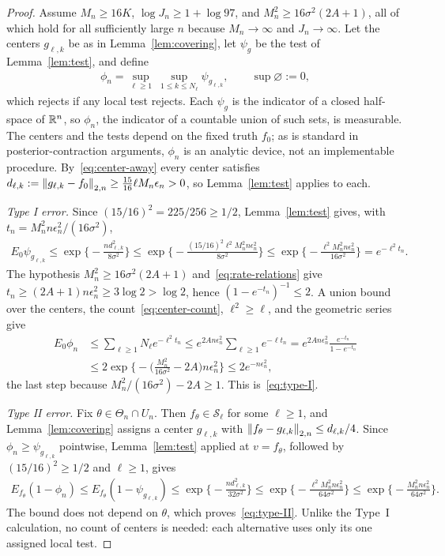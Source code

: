\begin{proof}[Proof]
Assume $M_n\geq16K$, $\log J_n\geq1+\log97$, and $M_n^2\geq16\sigma^2(2A+1)$, all of which hold for all sufficiently large $n$ because $M_n\to\infty$ and $J_n\to\infty$. Let the centers $g_{\ell,k}$ be as in Lemma~\ref{lem:covering}, let $\psi_g$ be the test of Lemma~\ref{lem:test}, and define
\begin{align*}
\phi_n=\sup_{\ell\geq1}\ \sup_{1\leq k\leq N_\ell}\psi_{g_{\ell,k}},
\qquad\sup\varnothing:=0,
\end{align*}
which rejects if any local test rejects. Each $\psi_g$ is the indicator of a closed half-space of $\mathbb{R}^n$, so $\phi_n$, the indicator of a countable union of such sets, is measurable. The centers and the tests depend on the fixed truth $f_0$; as is standard in posterior-contraction arguments, $\phi_n$ is an analytic device, not an implementable procedure. By~\eqref{eq:center-away} every center satisfies $d_{\ell,k}:=\left\lVert g_{\ell,k}-f_0 \right\rVert_{2,n}\geq\frac{15}{16}\ell M_n\epsilon_n>0$, so Lemma~\ref{lem:test} applies to each.

\emph{Type I error.} Since $(15/16)^2=225/256\geq1/2$, Lemma~\ref{lem:test} gives, with $t_n=M_n^2n\epsilon_n^2/(16\sigma^2)$,
\begin{align*}
E_0\psi_{g_{\ell,k}}
\leq\exp\Big\{-\frac{nd_{\ell,k}^2}{8\sigma^2}\Big\}
\leq\exp\Big\{-\frac{(15/16)^2\ell^2M_n^2n\epsilon_n^2}{8\sigma^2}\Big\}
\leq\exp\Big\{-\frac{\ell^2M_n^2n\epsilon_n^2}{16\sigma^2}\Big\}
=e^{-\ell^2t_n}.
\end{align*}
The hypothesis $M_n^2\geq16\sigma^2(2A+1)$ and~\eqref{eq:rate-relations} give $t_n\geq(2A+1)n\epsilon_n^2\geq3\log2>\log2$, hence $(1-e^{-t_n})^{-1}\leq2$. A union bound over the centers, the count~\eqref{eq:center-count}, $\ell^2\geq\ell$, and the geometric series give
\begin{align*}
E_0\phi_n
&\leq\sum_{\ell\geq1}N_\ell e^{-\ell^2t_n}
\leq e^{2An\epsilon_n^2}\sum_{\ell\geq1}e^{-\ell t_n}
=e^{2An\epsilon_n^2}\frac{e^{-t_n}}{1-e^{-t_n}}\\
&\leq2\exp\Big\{-\Big(\frac{M_n^2}{16\sigma^2}-2A\Big)n\epsilon_n^2\Big\}
\leq2e^{-n\epsilon_n^2},
\end{align*}
the last step because $M_n^2/(16\sigma^2)-2A\geq1$. This is~\eqref{eq:type-I}.

\emph{Type II error.} Fix $\theta\in\Theta_n\cap U_n$. Then $f_\theta\in\mathcal S_\ell$ for some $\ell\geq1$, and Lemma~\ref{lem:covering} assigns a center $g_{\ell,k}$ with $\left\lVert f_\theta-g_{\ell,k} \right\rVert_{2,n}\leq d_{\ell,k}/4$. Since $\phi_n\geq\psi_{g_{\ell,k}}$ pointwise, Lemma~\ref{lem:test} applied at $v=f_\theta$, followed by $(15/16)^2\geq1/2$ and $\ell\geq1$, gives
\begin{align*}
E_{f_\theta}(1-\phi_n)
\leq E_{f_\theta}(1-\psi_{g_{\ell,k}})
\leq\exp\Big\{-\frac{nd_{\ell,k}^2}{32\sigma^2}\Big\}
\leq\exp\Big\{-\frac{\ell^2M_n^2n\epsilon_n^2}{64\sigma^2}\Big\}
\leq\exp\Big\{-\frac{M_n^2n\epsilon_n^2}{64\sigma^2}\Big\}.
\end{align*}
The bound does not depend on $\theta$, which proves~\eqref{eq:type-II}. Unlike the Type~I calculation, no count of centers is needed: each alternative uses only its one assigned local test.
\end{proof}


